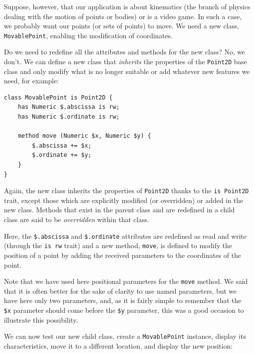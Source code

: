 Suppose, however, that our application is about kinematics 
(the branch of physics dealing with the motion of points or 
bodies) or is a video game. In such a case, we probably want 
our points (or sets of points) to move. We need a new class, 
{\tt MovablePoint}, enabling the modification of coordinates.

Do we need to redefine all the attributes and methods for 
the new class? No, we don't. We can define a new class that 
\emph{inherits} the properties of the {\tt Point2D} base class 
and only modify what is no longer suitable or add whatever 
new features we need, for example:

\begin{verbatim}
class MovablePoint is Point2D {
    has Numeric $.abscissa is rw;
    has Numeric $.ordinate is rw;
    
    method move (Numeric $x, Numeric $y) {
        $.abscissa += $x;
        $.ordinate += $y;
    }
}
\end{verbatim}

Again, the new class inherits the properties of {\tt Point2D} thanks 
to the {\tt is Point2D} trait, except those which are explicitly 
modified (or overridden) or added in the new class. 
Methods that exist in the parent class and are 
redefined in a child class are said to be \emph{overridden} 
within that class. 

Here, the \verb'$.abscissa' and \verb'$.ordinate' attributes are 
redefined as read and write (through the {\tt is rw} trait) and 
a new method, {\tt move}, is defined to modify the position of 
a point by adding the received parameters to the coordinates 
of the point.

Note that we have used here positional parameters for the 
{\tt move} method. We said that it is often better for the sake of clarity 
to use named parameters, but we have here only two parameters, 
and, as it is fairly simple to remember that the \verb'$x' 
parameter should come before the \verb'$y' parameter, this 
was a good occasion to illustrate this possibility.

We can now test our new child class, create a {\tt MovablePoint} 
instance, display its characteristics, move it to a different 
location, and display the new position:

